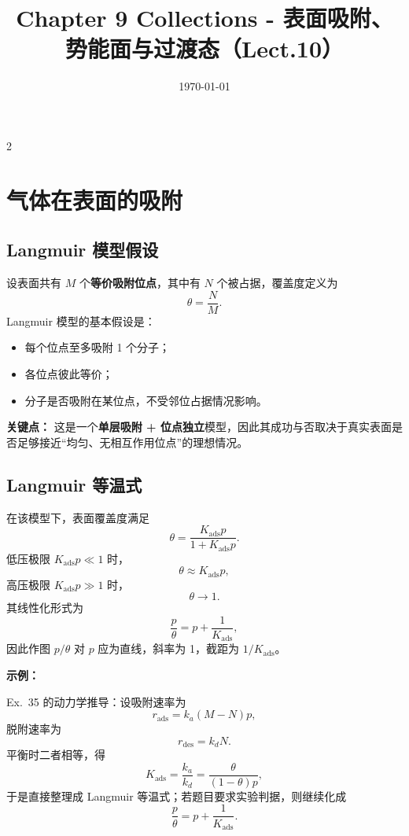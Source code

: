 \documentclass[a4paper,9pt]{article}
\title{\vspace{-2em}\Large\bfseries\color{sectioncolor} Chapter 9 Collections - 表面吸附、势能面与过渡态（Lect.10）\vspace{-1em}}
\author{}
\date{\today}
\newenvironment{keypoint}
{\par\vspace{0.3em}\noindent\begin{tcolorbox}[colback=keybg,colframe=keycolor,boxrule=0.5pt,arc=2pt,left=2pt,right=2pt,top=2pt,bottom=2pt,boxsep=0pt]\noindent\textcolor{keycolor}{\textbf{关键点：}}}
{\end{tcolorbox}\par\vspace{0.3em}}
\newenvironment{examplebox}
{\par\vspace{0.3em}\noindent\begin{tcolorbox}[colback=boxbg,colframe=derivcolor,boxrule=0.5pt,arc=2pt,left=2pt,right=2pt,top=2pt,bottom=2pt,boxsep=0pt]\scriptsize\noindent\textcolor{derivcolor}{\textbf{示例：}}\par\setlength{\parskip}{0.1ex}\setlength{\itemsep}{0pt}\setlength{\parsep}{0pt}}
{\end{tcolorbox}\par\vspace{0.3em}}
\begin{document}
\maketitle
\thispagestyle{fancy}

\begin{multicols}{2}
\scriptsize{\tableofcontents}

\section{气体在表面的吸附}

\subsection{Langmuir 模型假设}
设表面共有 $M$ 个\textbf{等价吸附位点}，其中有 $N$ 个被占据，覆盖度定义为
\[
\theta=\frac{N}{M}.
\]
Langmuir 模型的基本假设是：
\begin{itemize}
  \item 每个位点至多吸附 1 个分子；
  \item 各位点彼此等价；
  \item 分子是否吸附在某位点，不受邻位占据情况影响。
\end{itemize}

\begin{keypoint}
这是一个\textbf{单层吸附 + 位点独立}模型，因此其成功与否取决于真实表面是否足够接近“均匀、无相互作用位点”的理想情况。
\end{keypoint}

\subsection{Langmuir 等温式}
在该模型下，表面覆盖度满足
\[
\theta=\frac{K_{\mathrm{ads}}p}{1+K_{\mathrm{ads}}p}.
\]
低压极限 $K_{\mathrm{ads}}p\ll 1$ 时，
\[
\theta\approx K_{\mathrm{ads}}p,
\]
高压极限 $K_{\mathrm{ads}}p\gg 1$ 时，
\[
\theta\to 1.
\]
其线性化形式为
\[
\frac{p}{\theta}=p+\frac{1}{K_{\mathrm{ads}}},
\]
因此作图 $p/\theta$ 对 $p$ 应为直线，斜率为 1，截距为 $1/K_{\mathrm{ads}}$。

\begin{examplebox}
Ex.~35 的动力学推导：设吸附速率为
\[
r_{\mathrm{ads}}=k_a(M-N)p,
\]
脱附速率为
\[
r_{\mathrm{des}}=k_dN.
\]
平衡时二者相等，得
\[
K_{\mathrm{ads}}=\frac{k_a}{k_d}=\frac{\theta}{(1-\theta)p},
\]
于是直接整理成 Langmuir 等温式；若题目要求实验判据，则继续化成
\[
\frac{p}{\theta}=p+\frac{1}{K_{\mathrm{ads}}}.
\]
\end{examplebox}


\end{multicols}
\end{document}
